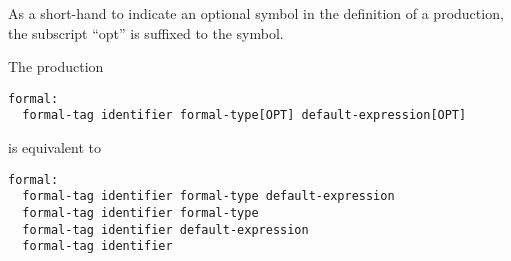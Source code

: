 As a short-hand to indicate an optional symbol in the definition of a
production, the subscript ``opt'' is suffixed to the symbol.
\begin{example}
The production
\begin{syntaxdonotcollect}
\begin{verbatim}
formal:
  formal-tag identifier formal-type[OPT] default-expression[OPT]
\end{verbatim}
\end{syntaxdonotcollect}
is equivalent to
\begin{syntaxdonotcollect}
\begin{verbatim}
formal:
  formal-tag identifier formal-type default-expression
  formal-tag identifier formal-type
  formal-tag identifier default-expression
  formal-tag identifier
\end{verbatim}
\end{syntaxdonotcollect}
\end{example}
